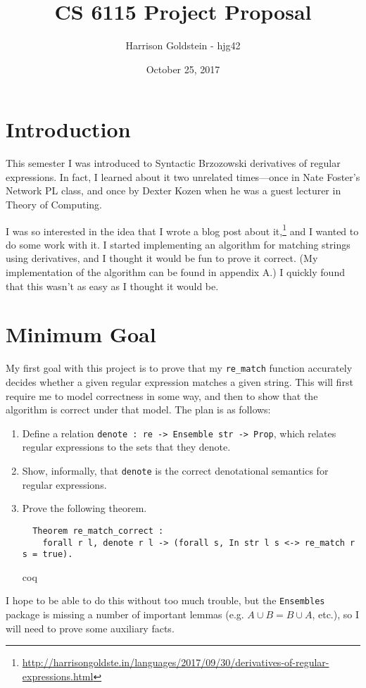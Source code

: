 \documentclass{article}
\author{Harrison Goldstein - hjg42}
\title{CS 6115 Project Proposal}
\date{October 25, 2017}
\begin{document}
\maketitle

\section{Introduction}
This semester I was introduced to Syntactic Brzozowski derivatives of regular
expressions. In fact, I learned about it two unrelated times---once in Nate
Foster's Network PL class, and once by Dexter Kozen when he was a guest lecturer
in Theory of Computing.

I was so interested in the idea that I wrote a blog post about
it,\footnote{\url{http://harrisongoldste.in/languages/2017/09/30/derivatives-of-regular-expressions.html}}
and I wanted to do some work with it. I started implementing an algorithm for
matching strings using derivatives, and I thought it would be fun to prove it
correct. (My implementation of the algorithm can be found in appendix A.) I
quickly found that this wasn't as easy as I thought it would be.

\section{Minimum Goal}
My first goal with this project is to prove that my \verb|re_match| function
accurately decides whether a given regular expression matches a given string.
This will first require me to model correctness in some way, and then to show
that the algorithm is correct under that model. The plan is as follows:
\begin{enumerate}
  \item Define a relation \verb|denote : re -> Ensemble str -> Prop|, which
    relates regular expressions to the sets that they denote.
  \item Show, informally, that \verb|denote| is the correct denotational
    semantics for regular expressions.
  \item Prove the following theorem.
\begin{verbatim}
  Theorem re_match_correct :
    forall r l, denote r l -> (forall s, In str l s <-> re_match r s = true).
\end{verbatim}{coq}
\end{enumerate}
I hope to be able to do this without too much trouble, but the \verb|Ensembles|
package is missing a number of important lemmas (e.g. $A \cup B = B \cup A$,
etc.), so I will need to prove some auxiliary facts.
\end{document}

